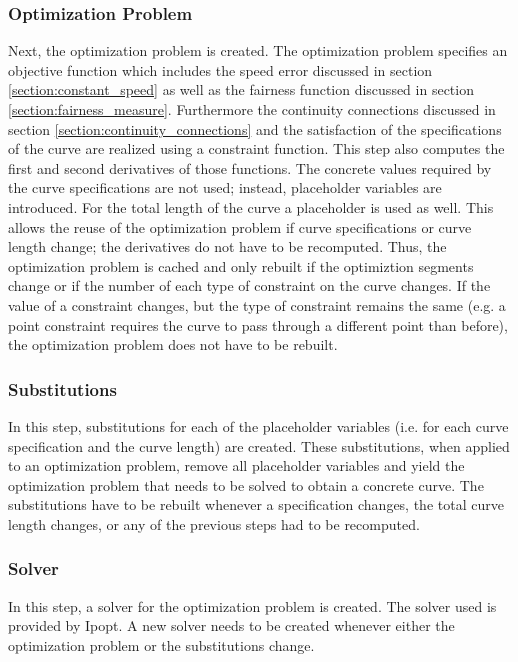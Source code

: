 \documentclass[a4paper]{article}
\begin{document}
				\subsubsection{Optimization Problem}
					Next, the optimization problem is created. The optimization problem specifies an objective function which includes the speed error discussed in section \ref{section:constant_speed} as well as the fairness function discussed in section \ref{section:fairness_measure}. Furthermore the continuity connections discussed in section \ref{section:continuity_connections} and the satisfaction of the specifications of the curve are realized using a constraint function. This step also computes the first and second derivatives of those functions. The concrete values required by the curve specifications are not used; instead, placeholder variables are introduced. For the total length of the curve a placeholder is used as well. This allows the reuse of the optimization problem if curve specifications or curve length change; the derivatives do not have to be recomputed. Thus, the optimization problem is cached and only rebuilt if the optimiztion segments change or if the number of each type of constraint on the curve changes. If the value of a constraint changes, but the type of constraint remains the same (e.g. a point constraint requires the curve to pass through a different point than before), the optimization problem does not have to be rebuilt.
					
				\subsubsection{Substitutions}
					In this step, substitutions for each of the placeholder variables (i.e. for each curve specification and the curve length) are created. These substitutions, when applied to an optimization problem, remove all placeholder variables and yield the optimization problem that needs to be solved to obtain a concrete curve. The substitutions have to be rebuilt whenever a specification changes, the total curve length changes, or any of the previous steps had to be recomputed.
					
				\subsubsection{Solver}
					In this step, a solver for the optimization problem is created. The solver used is provided by Ipopt. A new solver needs to be created whenever either the optimization problem or the substitutions change.
				
\end{document}
